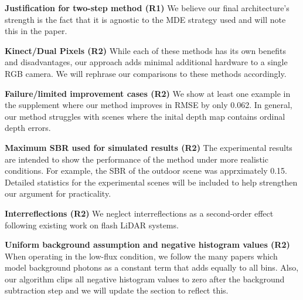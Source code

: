 \documentclass[10pt,twocolumn,letterpaper]{article}
\begin{document}

\vspace{1mm}\noindent\textbf{Justification for two-step method (R1)} We believe
our final architecture's strength is the fact that it is agnostic to the
MDE strategy used and will note this in the paper.

\vspace{1mm}\noindent\textbf{Kinect/Dual Pixels (R2)} While each of these methods has its own
benefits and disadvantages, our approach adds minimal additional hardware to a
single RGB camera. We will rephrase our comparisons to these methods accordingly.

\vspace{1mm}\noindent\textbf{Failure/limited improvement cases (R2)} We show at least one example in
the supplement where our method improves in RMSE by only 0.062. In general, our
method struggles with scenes where the inital depth map contains ordinal depth
errors.

\vspace{1mm}\noindent\textbf{Maximum SBR used for simulated results (R2)} The
experimental results are intended to show the performance of the method under
more realistic conditions. For example, the SBR of the outdoor scene was
apprximately 0.15. Detailed statistics for the experimental scenes will be
included to help strengthen our argument for practicality.

\vspace{1mm}\noindent\textbf{Interreflections (R2)} We neglect interreflections
as a second-order effect following existing work on flash LiDAR systems. \cite{iddan20013dstudio}

\vspace{1mm}\noindent\textbf{Uniform background assumption and negative
  histogram values (R2)} When operating in the low-flux condition, we follow the
many papers \cite{lindell2018} which model background photons as a constant term that adds equally to all bins.
Also, our algorithm clips all negative histogram values to zero after the background
subtraction step and we will update the section to reflect this.  
\end{document}
